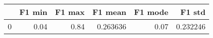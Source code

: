 \begin{tabular}{lrrrrr}
\toprule
{} &  F1 min &  F1 max &   F1 mean &  F1 mode &    F1 std \\
\midrule
0 &    0.04 &    0.84 &  0.263636 &     0.07 &  0.232246 \\
\bottomrule
\end{tabular}
